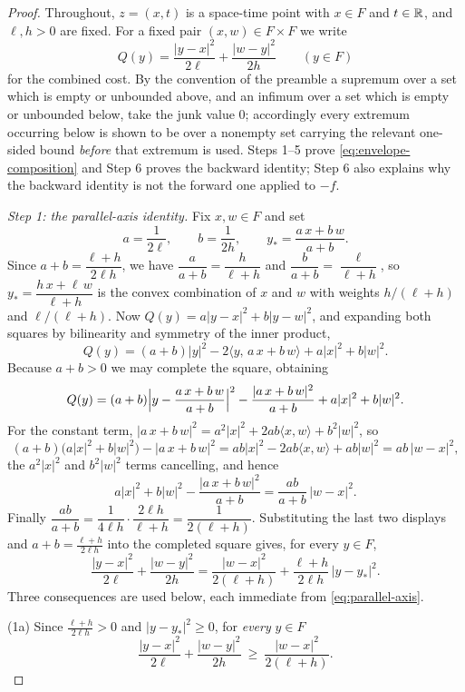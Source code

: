 \begin{proof}
Throughout, $z=(x,t)$ is a space-time point with $x\in F$ and $t\in\mathbb{R}$, and
$\ell,h>0$ are fixed. For a fixed pair $(x,w)\in F\times F$ we write
\[
  Q(y)=\frac{|y-x|^2}{2\ell}+\frac{|w-y|^2}{2h}\qquad(y\in F)
\]
for the combined cost. By the convention of the preamble a supremum over a set
which is empty or unbounded above, and an infimum over a set which is empty or
unbounded below, take the junk value $0$; accordingly every extremum occurring
below is shown to be over a nonempty set carrying the relevant one-sided bound
\emph{before} that extremum is used. Steps 1--5 prove
\eqref{eq:envelope-composition} and Step 6 proves the backward identity; Step 6
also explains why the backward identity is not the forward one applied to $-f$.

\emph{Step 1: the parallel-axis identity.}
Fix $x,w\in F$ and set
\[
  a=\frac1{2\ell},\qquad b=\frac1{2h},\qquad
  y_*=\frac{a\,x+b\,w}{a+b} .
\]
Since $a+b=\dfrac{\ell+h}{2\ell h}$, we have $\dfrac{a}{a+b}=\dfrac{h}{\ell+h}$
and $\dfrac{b}{a+b}=\dfrac{\ell}{\ell+h}$, so
$y_*=\dfrac{h\,x+\ell\,w}{\ell+h}$ is the convex combination of $x$ and $w$
with weights $h/(\ell+h)$ and $\ell/(\ell+h)$. Now $Q(y)=a|y-x|^2+b|y-w|^2$,
and expanding both squares by bilinearity and symmetry of the inner product,
\[
  Q(y)=(a+b)|y|^2-2\langle y,\,a\,x+b\,w\rangle+a|x|^2+b|w|^2 .
\]
Because $a+b>0$ we may complete the square, obtaining
\[
  Q(y)=(a+b)\Bigl|y-\frac{a\,x+b\,w}{a+b}\Bigr|^2
    -\frac{|a\,x+b\,w|^2}{a+b}+a|x|^2+b|w|^2 .
\]
For the constant term, $|a\,x+b\,w|^2=a^2|x|^2+2ab\langle x,w\rangle+b^2|w|^2$,
so
\[
  (a+b)\bigl(a|x|^2+b|w|^2\bigr)-|a\,x+b\,w|^2
   =ab|x|^2-2ab\langle x,w\rangle+ab|w|^2
   =ab\,|w-x|^2 ,
\]
the $a^2|x|^2$ and $b^2|w|^2$ terms cancelling, and hence
\[
  a|x|^2+b|w|^2-\frac{|a\,x+b\,w|^2}{a+b}=\frac{ab}{a+b}\,|w-x|^2 .
\]
Finally $\dfrac{ab}{a+b}=\dfrac{1}{4\ell h}\cdot\dfrac{2\ell h}{\ell+h}
=\dfrac1{2(\ell+h)}$. Substituting the last two displays and
$a+b=\frac{\ell+h}{2\ell h}$ into the completed square gives, for every
$y\in F$,
\begin{equation}\label{eq:parallel-axis}
  \frac{|y-x|^2}{2\ell}+\frac{|w-y|^2}{2h}
   =\frac{|w-x|^2}{2(\ell+h)}+\frac{\ell+h}{2\ell h}\,|y-y_*|^2 .
\end{equation}
Three consequences are used below, each immediate from
\eqref{eq:parallel-axis}.

(1a) Since $\frac{\ell+h}{2\ell h}>0$ and $|y-y_*|^2\ge0$, for \emph{every}
$y\in F$
\[
  \frac{|y-x|^2}{2\ell}+\frac{|w-y|^2}{2h}\ \ge\ \frac{|w-x|^2}{2(\ell+h)} .
\]


\end{proof}
